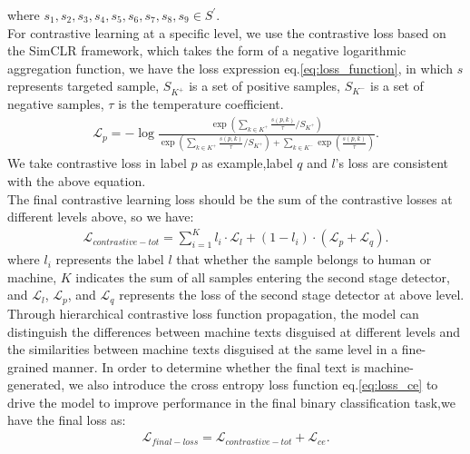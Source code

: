 \documentclass[11pt]{article}
\newcommand{\greenCitep}[1]{\textcolor{darkgreen}{\citep{#1}}}
\begin{document}
    where $s_1,s_2,s_3,s_4,s_5,s_6,s_7,s_8,s_9 \in S^\prime$. \\
    For contrastive learning at a specific level, we use the contrastive loss based on the SimCLR framework\greenCitep{chen2020simclr}, which takes the form of a negative logarithmic aggregation function, we have the loss expression eq.\ref{eq:loss_function}, in which $s$ represents targeted sample, $S_{K^+}$ is a set of positive samples, $S_{K^-}$ is a set of negative samples, $\tau$ is the temperature coefficient.
    \begin{equation}
      \begin{aligned}
          \label{eq:loss_function}
           \mathcal L_p= -\log \frac{\exp \left( \sum_{k \in K^+} \frac{s(p, k)}{\tau} / S_{K^+} \right)}{\exp \left( \sum_{k \in K^+} \frac{s(p, k)}{\tau} / S_{K^+} \right) + \sum_{k \in K^-} \exp \left( \frac{s(p, k)}{\tau} \right)}.
      \end{aligned}
      \end{equation}
    We take contrastive loss in label $p$ as example,label $q$ and $l$'s loss are consistent with the above equation.\\
    The final contrastive learning loss should be the sum of the contrastive losses at different levels above, so we have:
    \begin{equation}
      \begin{aligned}
      \label{eq:final_contrastive_loss}
      \mathcal L_{contrastive-tot} = \displaystyle\sum_{i=1}^K l_i \cdot \mathcal L_l + (1 - l_i) \cdot (\mathcal L_p + \mathcal L_q ).
      \end{aligned}
  \end{equation}
  where $l_i$ represents the label $l$ that whether the sample belongs to human or machine, $K$ indicates the sum of all samples entering the second stage detector, and $\mathcal L_l$, $\mathcal L_p$, and $\mathcal L_q$ represents the loss of the second stage detector at above level.\\
  Through hierarchical contrastive loss function propagation, the model can distinguish the differences between machine texts disguised at different levels and the similarities between machine texts disguised at the same level in a fine-grained manner. In order to determine whether the final text is machine-generated, we also introduce the cross entropy loss function eq.\ref{eq:loss_ce} to drive the model to improve performance in the final binary classification task,we have the final loss as:
  \begin{equation}
    \begin{aligned}
        \label{eq:loss_overall}
        \mathcal L_{final-loss}=\mathcal L_{contrastive-tot} + \mathcal L_{ce}.
    \end{aligned}
    \end{equation}
\end{document}
